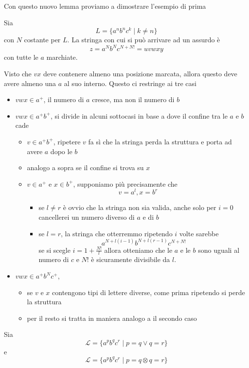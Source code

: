 \documentclass[12pt]{report}
\theoremstyle{definition}
\begin{document}
Con questo nuovo lemma proviamo a dimostrare l'esempio di prima
\begin{tcolorbox}[breakable]
	Sia
	$$ L = \{ a^n b^n c^k \mid k \neq n \} $$
	con $N$ costante per $L$.
	La stringa con cui si può arrivare ad un assurdo è
	$$ z = a^N b^N c^{N + N!} = uvwxy $$
	con tutte le $a$ marchiate.

	Visto che $vx$ deve contenere almeno una posizione marcata, allora questo deve avere almeno una $a$ al suo interno.
	Questo ci restringe ai tre casi
	\begin{itemize}
		\item $vwx \in a^+$, il numero di $a$ cresce, ma non il numero di $b$
		\item $vwx \in a^+ b^+$, si divide in alcuni sottocasi in base a dove il confine tra le $a$ e $b$ cade
			\begin{itemize}
				\item $v \in a^+ b^+$, ripetere $v$ fa sì che la stringa perda la struttura e porta ad avere $a$ dopo le $b$
				\item analogo a sopra se il confine si trova su $x$
				\item $v \in a^+$ e $x \in b^+$, supponiamo più precisamente che
					$$ v = a^l, x = b^r $$
					\begin{itemize}
						\item se $l \neq r$ è ovvio che la stringa non sia valida, anche solo per $i = 0$ cancellerei un numero diverso di $a$ e di $b$
						\item se $l = r$, la stringa che otterremmo ripetendo $i$ volte sarebbe
							$$ a^{N + l(i - 1)} b^{N + l(r - 1)} c^{N + N!} $$
							se si scegle $i = 1 + \frac{N!}{l}$ allora otteniamo che le $a$ e le $b$ sono uguali al numero di $c$ e $N!$ è sicuramente divisibile da $l$.
					\end{itemize}
			\end{itemize}
		\item $vwx \in a^+ b^N c^+ $, 
			\begin{itemize}
				\item se $v$ e $x$ contengono tipi di lettere diverse, come prima ripetendo si perde la struttura
				\item per il resto si tratta in maniera analogo a il secondo caso
			\end{itemize}
	\end{itemize}
\end{tcolorbox}

\begin{tcolorbox}[breakable]
	Sia
	$$ \mathcal{L} = \{ a^p b^q c^r \mid p = q \vee q = r \} $$
	e 
	$$ \mathcal{L} = \{ a^p b^q c^r \mid p = q \otimes q = r \} $$
\end{tcolorbox}
\end{document}

